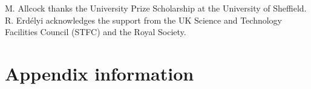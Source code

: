 \documentclass{aastex61}
\begin{document}
\acknowledgments
M. Allcock thanks the University Prize Scholarship at the University of Sheffield. R. Erd\'{e}lyi acknowledges the support from the UK Science and Technology Facilities Council (STFC) and the Royal Society. 


\appendix

\section{Appendix information}






%
%
\end{document}
